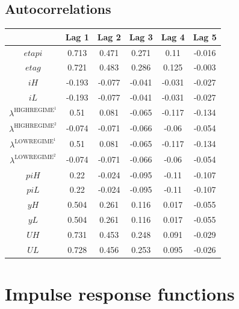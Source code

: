 \subsection{Autocorrelations}

\begin{tabular}{c|ccccc|}
  & Lag 1 & Lag 2 & Lag 3 & Lag 4 & Lag 5\\
\hline
${e\!t\!a\!p\!i}$ & 0.713 & 0.471 & 0.271 & 0.11 & -0.016 \\
${e\!t\!a\!g}$ & 0.721 & 0.483 & 0.286 & 0.125 & -0.003 \\
${i\!H}$ & -0.193 & -0.077 & -0.041 & -0.031 & -0.027 \\
${i\!L}$ & -0.193 & -0.077 & -0.041 & -0.031 & -0.027 \\
$\lambda^{\mathrm{HIGHREGIME}^{\mathrm{1}}}$ & 0.51 & 0.081 & -0.065 & -0.117 & -0.134 \\
$\lambda^{\mathrm{HIGHREGIME}^{\mathrm{2}}}$ & -0.074 & -0.071 & -0.066 & -0.06 & -0.054 \\
$\lambda^{\mathrm{LOWREGIME}^{\mathrm{1}}}$ & 0.51 & 0.081 & -0.065 & -0.117 & -0.134 \\
$\lambda^{\mathrm{LOWREGIME}^{\mathrm{2}}}$ & -0.074 & -0.071 & -0.066 & -0.06 & -0.054 \\
${p\!i\!H}$ & 0.22 & -0.024 & -0.095 & -0.11 & -0.107 \\
${p\!i\!L}$ & 0.22 & -0.024 & -0.095 & -0.11 & -0.107 \\
${y\!H}$ & 0.504 & 0.261 & 0.116 & 0.017 & -0.055 \\
${y\!L}$ & 0.504 & 0.261 & 0.116 & 0.017 & -0.055 \\
${U\!H}$ & 0.731 & 0.453 & 0.248 & 0.091 & -0.029 \\
${U\!L}$ & 0.728 & 0.456 & 0.253 & 0.095 & -0.026 \\
\hline
\end{tabular}



\pagebreak

\section{Impulse response functions}

